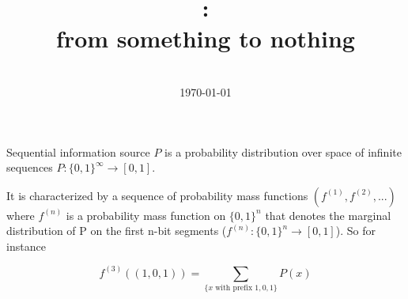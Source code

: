 \documentclass[11pt]{article}
\title{\TITLE: \\from something to nothing}
\author{\FNAME\ \LNAME\\\today}
\date{} %
\begin{document}
\thispagestyle{empty}
Sequential information source $P$ is a probability distribution over space of infinite sequences $P:\{0,1\}^\infty\to [0,1]$.

It is characterized by a sequence of probability mass functions $(f^{(1)},f^{(2)},...)$ where $f^{(n)}$ is a probability mass function on $\{0,1\}^n$ that denotes the marginal distribution of P on the first n-bit segments ($f^{(n)}:\{0,1\}^n\to [0,1]$). So for instance

\[f^{(3)}((1,0,1))=\sum_{\{x \text{ with prefix }1,0,1\}} P(x)\]


% 
\end{document}
